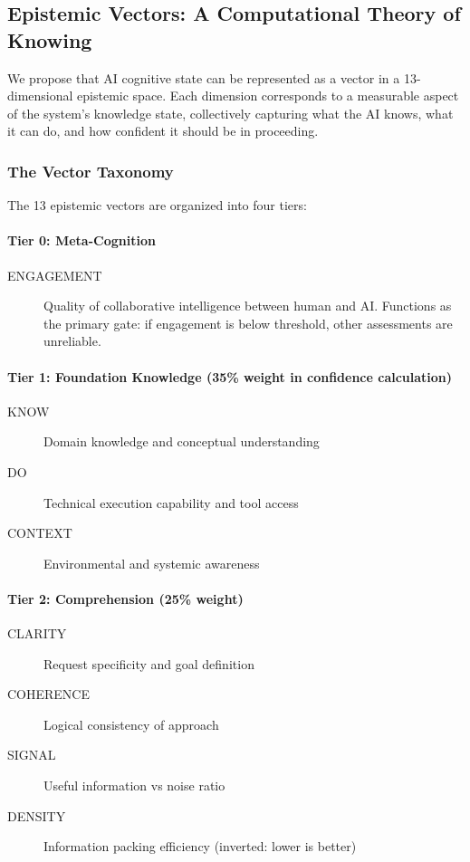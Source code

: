 
\subsection{Epistemic Vectors: A Computational Theory of Knowing}

We propose that AI cognitive state can be represented as a vector in a 13-dimensional epistemic space. Each dimension corresponds to a measurable aspect of the system's knowledge state, collectively capturing what the AI knows, what it can do, and how confident it should be in proceeding.

\subsubsection{The Vector Taxonomy}

The 13 epistemic vectors are organized into four tiers:

\paragraph{Tier 0: Meta-Cognition}
\begin{description}
    \item[ENGAGEMENT] Quality of collaborative intelligence between human and AI. Functions as the primary gate: if engagement is below threshold, other assessments are unreliable.
\end{description}

\paragraph{Tier 1: Foundation Knowledge (35\% weight in confidence calculation)}
\begin{description}
    \item[KNOW] Domain knowledge and conceptual understanding
    \item[DO] Technical execution capability and tool access
    \item[CONTEXT] Environmental and systemic awareness
\end{description}

\paragraph{Tier 2: Comprehension (25\% weight)}
\begin{description}
    \item[CLARITY] Request specificity and goal definition
    \item[COHERENCE] Logical consistency of approach
    \item[SIGNAL] Useful information vs noise ratio
    \item[DENSITY] Information packing efficiency (inverted: lower is better)
\end{description}


